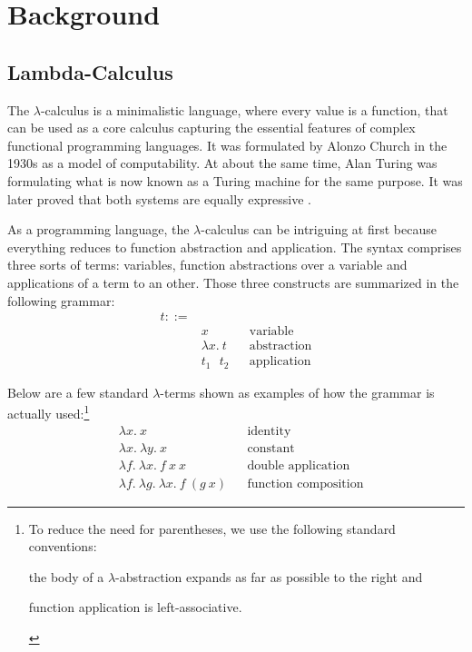 \section{Background}
\label{sec:background}

\subsection{Lambda-Calculus}
\label{sec:background-lambda-calculus}

The $\lambda$-calculus is a minimalistic language, where every value is a function, that can be used
as a core calculus capturing the essential features of complex functional programming languages. It
was formulated by Alonzo Church \cite{church-1936-unsolvable-problem} in the 1930s as a model of
computability. At about the same time, Alan Turing was formulating what is now known as a Turing
machine \cite{turing-1936-on-computable-numbers} for the same purpose. It was later proved that both
systems are equally expressive \cite{turing-1937-computability}.

As a programming language, the $\lambda$-calculus can be intriguing at first because everything
reduces to function abstraction and application. The syntax comprises three sorts of terms:
variables, function abstractions over a variable and applications of a term to an other. Those three
constructs are summarized in the following grammar:
\begin{align*}
  t ::= & \\
    & x && \text{variable} \\
    & \lambda x. \ t && \text{abstraction} \\
    & t_1 \text{ } t_2 && \text{application}
\end{align*}

Below are a few standard $\lambda$-terms shown as examples of how the grammar is actually
used:\footnote{To reduce the need for parentheses, we use the following standard conventions:
\begin{enumerate*}[label=(\arabic*)]
  \item the body of a $\lambda$-abstraction expands as far as possible to the right and
  \item function application is left-associative.
\end{enumerate*}}
\begin{align*}
  & \lambda x. \ x && \text{identity} \\
  & \lambda x. \ \lambda y. \ x && \text{constant} \\
  & \lambda f. \ \lambda x. \ f \ x \ x && \text{double application} \\
  & \lambda f. \ \lambda g. \ \lambda x. \ f \ (g \ x) && \text{function composition}
\end{align*}

